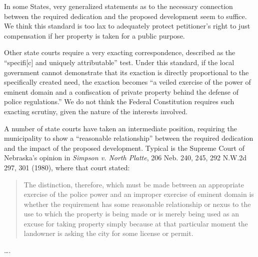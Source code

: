 In some States, very generalized statements as to the necessary connection
between the required dedication and the proposed development seem to suffice. We
think this standard is too lax to adequately protect petitioner's right to just
compensation if her property is taken for a public purpose.

Other state courts require a very exacting correspondence, described as the
``specifi[c] and uniquely attributable'' test.
Under this standard,
if the local government cannot demonstrate that its exaction is directly
proportional to the specifically created need, the exaction becomes ``a veiled
exercise of the power of eminent domain and a confiscation of private property
behind the defense of police regulations.''
We do not think the Federal Constitution requires such exacting scrutiny,
given the nature of the interests involved.

A number of state courts have taken an intermediate position, requiring the
municipality to show a ``reasonable relationship'' between the required
dedication and the impact of the proposed development. Typical is the Supreme
Court of Nebraska's opinion in \textit{Simpson v. North Platte}, 206 Neb. 240,
245, 292 N.W.2d 297, 301 (1980), where that court stated:
\begin{quote}
The distinction, therefore, which must be made between an appropriate exercise
of the police power and an improper exercise of eminent domain is whether the
requirement has some reasonable relationship or nexus to the use to which the
property is being made or is merely being used as an excuse for taking property
simply because at that particular moment the landowner is asking the city for
some license or permit.
\end{quote}

\ldots.

%

